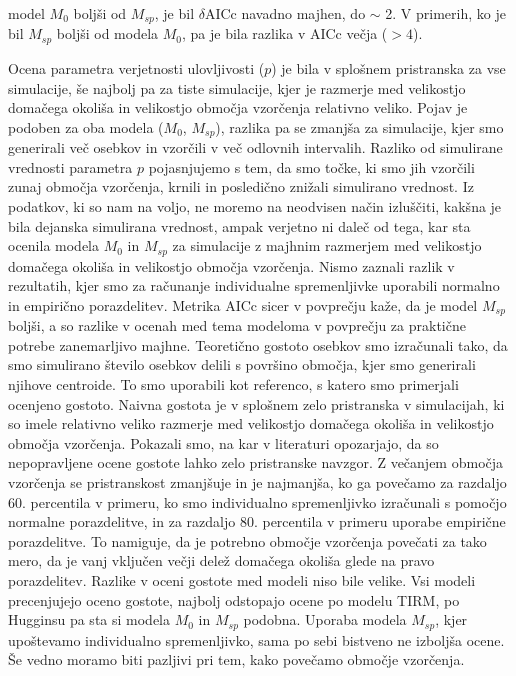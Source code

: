 model $M_0$ boljši od $M_{sp}$, je bil $\delta$AICc navadno majhen, do $\sim$ 2. V primerih, ko je bil $M_{sp}$ boljši od modela $M_0$, pa je bila razlika v AICc večja ($> 4$).

Ocena parametra verjetnosti ulovljivosti ($p$) je bila v splošnem pristranska za vse simulacije, še najbolj pa za tiste simulacije, kjer je razmerje med velikostjo domačega okoliša in velikostjo območja vzorčenja relativno veliko. Pojav je podoben za oba modela ($M_0$, $M_{sp}$), razlika pa se zmanjša za simulacije, kjer smo generirali več osebkov in vzorčili v več odlovnih intervalih. Razliko od simulirane vrednosti parametra $p$ pojasnjujemo s tem, da smo točke, ki smo jih vzorčili zunaj območja vzorčenja, krnili in posledično znižali simulirano vrednost. Iz podatkov, ki so nam na voljo, ne moremo na neodvisen način izluščiti, kakšna je bila dejanska simulirana vrednost, ampak verjetno ni daleč od tega, kar sta ocenila modela $M_0$ in $M_{sp}$ za simulacije z majhnim razmerjem med velikostjo domačega okoliša in velikostjo območja vzorčenja. Nismo zaznali razlik v rezultatih, kjer smo za računanje individualne spremenljivke uporabili normalno in empirično porazdelitev. Metrika AICc sicer v povprečju kaže, da je model $M_{sp}$ boljši, a so razlike v ocenah med tema modeloma v povprečju za praktične potrebe zanemarljivo majhne.
Teoretično gostoto osebkov smo izračunali tako, da smo simulirano število osebkov delili s površino območja, kjer smo generirali njihove centroide. To smo uporabili kot referenco, s katero smo primerjali ocenjeno gostoto. Naivna gostota je v splošnem zelo pristranska v simulacijah, ki so imele relativno veliko razmerje med velikostjo domačega okoliša in velikostjo območja vzorčenja. Pokazali smo, na kar v literaturi opozarjajo, da so nepopravljene ocene gostote lahko zelo pristranske navzgor. Z večanjem območja vzorčenja se pristranskost zmanjšuje in je najmanjša, ko ga povečamo za razdaljo 60. percentila v primeru, ko smo individualno spremenljivko izračunali s pomočjo normalne porazdelitve, in za razdaljo 80. percentila v primeru uporabe empirične porazdelitve. To namiguje, da je potrebno območje vzorčenja povečati za tako mero, da je vanj vključen večji delež domačega okoliša glede na pravo porazdelitev.
Razlike v oceni gostote med modeli niso bile velike. Vsi modeli precenjujejo oceno gostote, najbolj odstopajo ocene po modelu TIRM, po Hugginsu pa sta si modela $M_0$ in $M_{sp}$ podobna. Uporaba modela $M_{sp}$, kjer upoštevamo individualno spremenljivko, sama po sebi bistveno ne izboljša ocene. Še vedno moramo biti pazljivi pri tem, kako povečamo območje vzorčenja.

